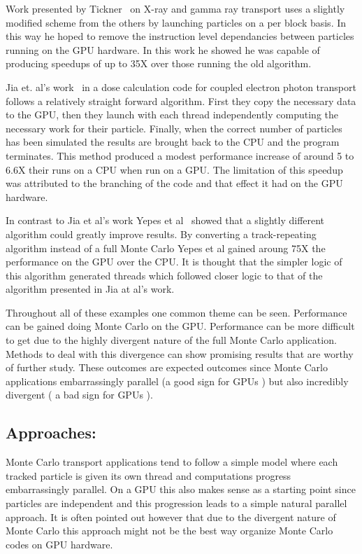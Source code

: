 Work presented by Tickner~\cite{tickner2010monte} on X-ray and gamma ray transport uses a slightly modified scheme from the others by launching particles on a per block basis.
%
In this way he hoped to remove the instruction level dependancies between particles running on the GPU hardware.
%
In this work he showed he was capable of producing speedups of up to 35X over those running the old algorithm.

Jia et. al's  work~\cite{jia2010development} in a dose calculation code for coupled electron photon transport follows a relatively straight forward algorithm.
%
First they copy the necessary data to the GPU, then they launch with each thread independently computing the necessary work for their particle.
%
Finally, when the correct number of particles has been simulated the results are brought back to the CPU and the program terminates.
%
This method produced a modest performance increase of around 5 to 6.6X their runs on a CPU when run on a GPU.
%
The limitation of this speedup was attributed to the branching of the code and that effect it had on the GPU hardware.

In contrast to Jia et al's work Yepes et al~\cite{yepes2010gpu} showed that a slightly different algorithm could greatly improve results.
%
By converting a track-repeating algorithm instead of a full Monte Carlo Yepes et al gained aroung 75X the performance on the GPU over the CPU.
%
It is thought that the simpler logic of this algorithm generated threads which followed closer logic to that of the algorithm presented in Jia at al's work.

Throughout all of these examples one common theme can be seen.
%
Performance can be gained doing Monte Carlo on the GPU.
%
Performance can be more difficult to get due to the highly divergent nature of the full Monte Carlo application.
%
Methods to deal with this divergence can show promising results that are worthy of further study.
%
These outcomes are expected outcomes since Monte Carlo applications embarrassingly parallel (a good sign for GPUs ) but also incredibly divergent ( a bad sign for GPUs ).

\subsection*{Approaches: }

Monte Carlo transport applications tend to follow a simple model where each tracked particle is given its own thread and computations progress embarrassingly parallel. 
%
On a GPU this also makes sense as a starting point since particles are independent and this progression leads to a simple natural parallel approach.
%
It is often pointed out however that due to the divergent nature of Monte Carlo this approach might not be the best way organize Monte Carlo codes on GPU hardware.
%

